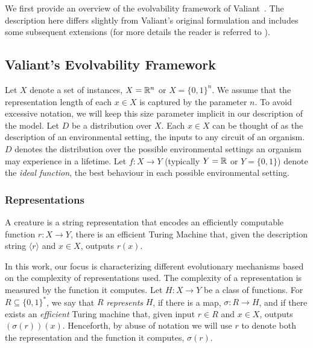 We first provide an overview of the evolvability framework of
Valiant~\cite{Valiant:2009-evolvability}. The description here differs slightly
from Valiant's original formulation and includes some subsequent extensions (for
more details the reader is referred to
\cite{Valiant:2009-evolvability,Feldman:2008-evolvability,
Feldman:2009-robustness, Valiant:2012-real, Kanade:2012-thesis}).

\subsection{Valiant's Evolvability Framework}
\label{sec:notation-model}

Let $X$ denote a set of instances, \eg $X = \mathbb{R}^n$ or $X = \{0, 1\}^n$. We
assume that the representation length of each $x \in X$ is captured by the
parameter $n$. To avoid excessive notation, we will keep this size parameter
implicit in our description of the model. Let $D$ be a distribution over $X$.
Each $x \in X$ can be thought of as the description of an environmental setting,
the inputs to any circuit of an organism. $D$ denotes the distribution over the
possible environmental settings an organism may experience in a lifetime. Let $f
: X \rightarrow Y$ (typically $Y = \mathbb{R}$ or $Y = \{0, 1\}$) denote the
\emph{ideal function}, the best behaviour in each possible environmental
setting.

\subsubsection*{Representations}

A creature is a string representation that encodes an efficiently computable
function $r : X \rightarrow Y$, \ie there is an efficient Turing Machine that,
given the description string $\langle r \rangle$ and $x \in X$, outputs $r(x)$.  

In this work, our focus is characterizing different evolutionary mechanisms
based on the complexity of representations used. 
The complexity of a representation is measured by the function it computes.  Let
$H : X \rightarrow Y$ be a class of functions. For $R \subseteq \{0, 1\}^*$,  we
say that $R$ \emph{represents} $H$, if there is a map, $\sigma : R \rightarrow
H$, and if there exists an \emph{efficient} Turing machine that, given input $r
\in R$ and $x \in X$, outputs $(\sigma(r))(x)$. Henceforth, by abuse of notation
we will use $r$ to denote both the representation and the function it computes,
$\sigma(r)$. 


